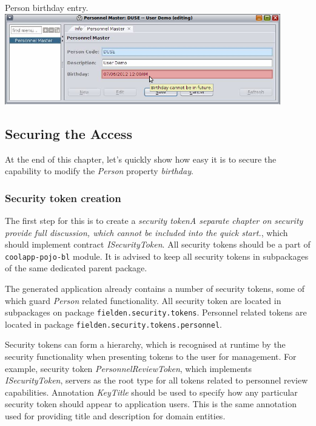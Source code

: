   \begin{image}{Person birthday entry.}{\label{img:ch00:03:person-master-error}}
    \includegraphics[width=0.9\textwidth]{parts/00-part/chapters/02-making-changes/images/11-person-master-error.png}
  \end{image}
  
\subsection{Securing the Access}

  At the end of this chapter, let's quickly show how easy it is to secure the capability to modify the \emph{Person} property \emph{birthday}.

  \subsubsection*{Security token creation}
  The first step for this is to create a \emph{security token}\emph{A separate chapter on security provide full discussion, which cannot be included into the quick start.}, which should implement contract \emph{ISecurityToken}.
  All security tokens should be a part of \texttt{coolapp-pojo-bl} module.
  It is advised to keep all security tokens in subpackages of the same dedicated parent package.

  The generated application already contains a number of security tokens, some of which guard \emph{Person} related functionality.
  All security token are located in subpackages on package \texttt{fielden.security.tokens}.
  Personnel related tokens are located in package \texttt{fielden.security.tokens.personnel}.
  
  Security tokens can form a hierarchy, which is recognised at runtime by the security functionality when presenting tokens to the user for management.
  For example, security token \emph{PersonnelReviewToken}, which implements \emph{ISecurityToken}, servers as the root type for all tokens related to personnel review capabilities.
  Annotation \emph{KeyTitle} should be used to specify how any particular security token should appear to application users.
  This is the same annotation used for providing title and description for domain entities.


